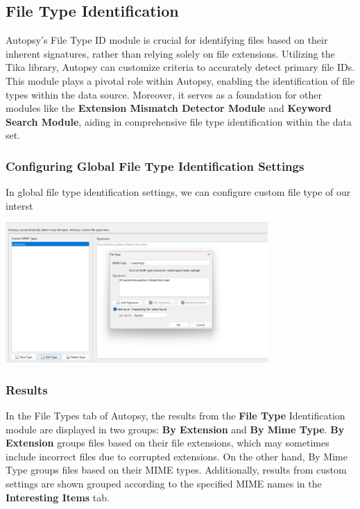 \documentclass{extarticle}
\begin{document}
\subsection{File Type Identification}

Autopsy's File Type ID module is crucial for identifying files based on their inherent signatures, rather than relying solely on file extensions. Utilizing the Tika library, Autopsy can customize criteria to accurately detect primary file IDs. This module plays a pivotal role within Autopsy, enabling the identification of file types within the data source. Moreover, it serves as a foundation for other modules like the \textbf{Extension Mismatch Detector Module} and \textbf{Keyword Search Module}, aiding in comprehensive file type identification within the data set.

\subsubsection*{Configuring Global File Type Identification Settings}
In global file type identification settings, we can configure custom file type of our interst

\begin{center}
    \includegraphics[width=0.75\textwidth]{3/3.3/File Type Identification Settings.png}
\end{center}

\subsubsection*{Results}
In the File Types tab of Autopsy, the results from the \textbf{File Type} Identification module are displayed in two groups: \textbf{By Extension} and \textbf{By Mime Type}. \textbf{By Extension} groups files based on their file extensions, which may sometimes include incorrect files due to corrupted extensions. On the other hand, By Mime Type groups files based on their MIME types. Additionally, results from custom settings are shown grouped according to the specified MIME names in the \textbf{Interesting Items} tab.
\end{document}
